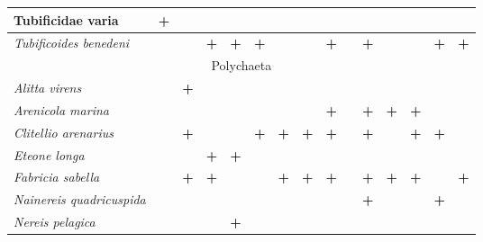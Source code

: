 \begin{footnotesize}
\begin{longtable}{|p{2.1cm}|p{0.38cm}p{0.38cm}|p{0.38cm}p{0.38cm}|p{0.38cm}p{0.38cm}|p{0.35cm}p{0.35cm}p{0.35cm}|p{1cm}|p{0.5cm}p{0.5cm}|p{1cm}|p{1cm}|}
Tubificidae varia         & \textbf{+}        &           &           &           &           &           &          &          &          &                 &          &          &          &            \\  \hline
{\it Tubificoides benedeni}     &           &           & \textbf{+}        & \textbf{+}        & \textbf{+}        &           &          & \textbf{+}       &          & \textbf{+}              &          &          & \textbf{+}       & \textbf{+}         \\ \hline
\multicolumn{15}{|c|}{Polychaeta} \\ \hline
{\it Alitta virens}             &           & \textbf{+}        &           &           &           &           &          &          &          &                 &          &          &          &            \\  \hline
{\it Arenicola marina}          &           &           &           &           &           &           &          & \textbf{+}       &          & \textbf{+}              & \textbf{+}       & \textbf{+}       &          &            \\  \hline
{\it Clitellio arenarius}       &           & \textbf{+}        &           &           & \textbf{+}        & \textbf{+}        & \textbf{+}       & \textbf{+}       &          & \textbf{+}              &          & \textbf{+}       & \textbf{+}       &            \\  \hline
{\it Eteone longa}              &           &           & \textbf{+}        & \textbf{+}        &           &           &          &          &          &                 &          &          &          &            \\  \hline
{\it Fabricia sabella}          &           & \textbf{+}        & \textbf{+}        &           &           & \textbf{+}        & \textbf{+}       & \textbf{+}       &          & \textbf{+}              & \textbf{+}       & \textbf{+}       &          & \textbf{+}         \\  \hline
{\it Nainereis quadricuspida}   &           &           &           &           &           &           &          &          &          & \textbf{+}              &          &          & \textbf{+}       &            \\  \hline
{\it Nereis pelagica}           &           &           &           & \textbf{+}        &           &           &          &          &          &                 &          &          &          &            \\  \hline

\end{longtable}
\end{footnotesize}
